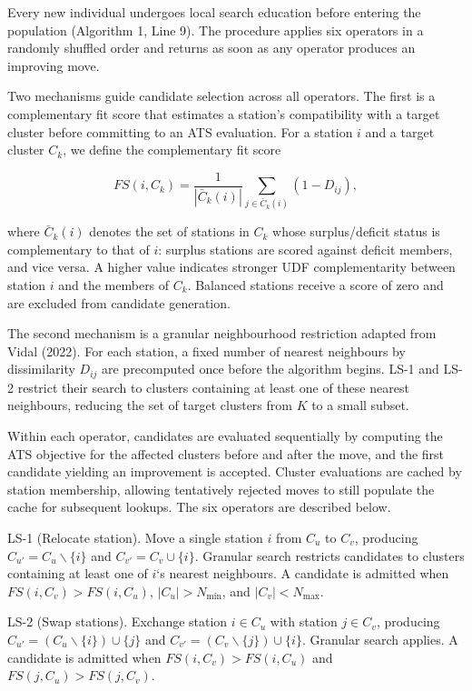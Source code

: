 \documentclass[11pt]{article}
\numberwithin{table}{section}
\numberwithin{figure}{section}
\begin{document}
Every new individual undergoes local search education before entering the population (Algorithm 1, Line 9). The procedure applies six operators in a randomly shuffled order and returns as soon as any operator produces an improving move.

Two mechanisms guide candidate selection across all operators. The first is a complementary fit score that estimates a station’s compatibility with a target cluster before committing to an ATS evaluation. For a station $i$ and a target cluster ${{C}_{k}}$, we define the complementary fit score

\[
FS(i,{{C}_{k}})=\frac{1}{|{{{\bar{C}}}_{k}}(i)|}\sum\limits_{j\in {{{\bar{C}}}_{k}}(i)}{(1-{{D}_{ij}})},
\]

where ${{\bar{C}}_{k}}(i)$ denotes the set of stations in ${{C}_{k}}$ whose surplus/deficit status is complementary to that of $i$: surplus stations are scored against deficit members, and vice versa. A higher value indicates stronger UDF complementarity between station $i$ and the members of ${{C}_{k}}$. Balanced stations receive a score of zero and are excluded from candidate generation.

The second mechanism is a granular neighbourhood restriction adapted from Vidal (2022). For each station, a fixed number of nearest neighbours by dissimilarity ${{D}_{ij}}$ are precomputed once before the algorithm begins. LS-1 and LS-2 restrict their search to clusters containing at least one of these nearest neighbours, reducing the set of target clusters from $K$ to a small subset.

Within each operator, candidates are evaluated sequentially by computing the ATS objective for the affected clusters before and after the move, and the first candidate yielding an improvement is accepted. Cluster evaluations are cached by station membership, allowing tentatively rejected moves to still populate the cache for subsequent lookups. The six operators are described below.

LS-1 (Relocate station). Move a single station $i$ from ${{C}_{u}}$ to ${{C}_{v}}$, producing ${{C}_{{{u}'}}}={{C}_{u}}\backslash \{i\}$ and ${{C}_{{{v}'}}}={{C}_{v}}\cup \{i\}$. Granular search restricts candidates to clusters containing at least one of $i$‘s nearest neighbours. A candidate is admitted when $FS(i,{{C}_{v}})>FS(i,{{C}_{u}})$, $|{{C}_{u}}|>{{N}_{\min }}$, and $|{{C}_{v}}|<{{N}_{\max }}$.

LS-2 (Swap stations). Exchange station $i\in {{C}_{u}}$ with station $j\in {{C}_{v}}$, producing ${{C}_{{{u}'}}}=({{C}_{u}}\backslash \{i\})\cup \{j\}$ and ${{C}_{{{v}'}}}=({{C}_{v}}\backslash \{j\})\cup \{i\}$. Granular search applies. A candidate is admitted when $FS(i,{{C}_{v}})>FS(i,{{C}_{u}})$ and $FS(j,{{C}_{u}})>FS(j,{{C}_{v}})$.
\end{document}
